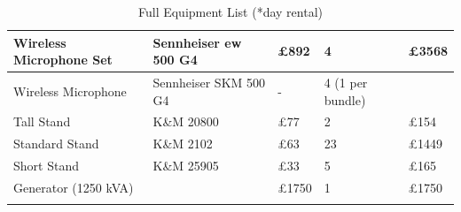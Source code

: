 \begin{longtable}[H]{|p{3cm}|p{4cm}|p{2cm}|p{3cm}|p{2cm}|}
Wireless Microphone Set            & Sennheiser ew 500 G4               & £892                          & 4                                  & £3568  \\ \hline
Wireless Microphone                & Sennheiser SKM 500 G4              & -                             & 4 (1 per bundle)                   &        \\ \hline
\rowcolor[HTML]{EFEFEF} 
Tall Stand                         & K\&M 20800                          & £77                           & 2                                  & £154   \\ \hline
\rowcolor[HTML]{EFEFEF} 
Standard Stand                     & K\&M 2102                           & £63                           & 23                                 & £1449  \\ \hline
\rowcolor[HTML]{EFEFEF} 
Short Stand                        & K\&M 25905                          & £33                           & 5                                  & £165   \\ \hline
Generator (1250 kVA)        &                &      £1750    &        1           &    £1750    \\ \hline
                    \caption{Full Equipment List (*day rental)}
                    \label{tab:full_equipment_list}
                \end{longtable}